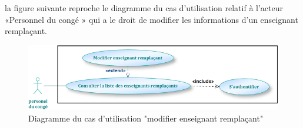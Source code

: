 \documentclass[12 pt ]{report}
\begin{document}
la figure suivante reproche le diagramme du cas d’utilisation  relatif à l’acteur «Personnel du congé » qui a le droit de modifier les informations d'un enseignant remplaçant.
\begin{figure}[h]
 \begin{center}
\includegraphics[width=13 cm ,height= 3.8 cm]{mod_ens_remp.PNG}
\caption{Diagramme du cas d’utilisation "modifier enseignant remplaçant"}
\end{center}
\end{figure}
\end{document}
